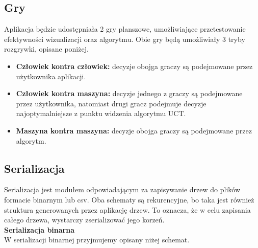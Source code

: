\documentclass{article}
\begin{document}
	\subsection{Gry}
	Aplikacja będzie udostępniała 2 gry planszowe, umożliwiające przetestowanie efektywności wizualizacji oraz algorytmu. Obie gry będą umożliwiały 3 tryby rozgrywki, opisane poniżej. \\
	
	\begin{itemize}
		\item \textbf{Człowiek kontra człowiek:} decyzje obojga graczy są podejmowane przez użytkownika aplikacji.
		\item \textbf{Człowiek kontra maszyna:} decyzje jednego z graczy są podejmowane przez użytkownika, natomiast drugi gracz podejmuje decyzje najoptymalniejsze z punktu widzenia algorytmu UCT.
		\item \textbf{Maszyna kontra maszyna:} decyzje obojga graczy są podejmowane przez algorytm. \\ 
	\end{itemize}
	
	\clearpage
	
	\subsection{Serializacja}
	Serializacja jest modułem odpowiadającym za zapisywanie drzew do plików formacie binarnym lub csv. Oba schematy są rekurencyjne, bo taka jest również struktura generowanych przez aplikację drzew. To oznacza, że w celu zapisania całego drzewa, wystarczy zserializować jego korzeń.\\
	
	\noindent \textbf{\large Serializacja binarna} \\
	W serializacji binarnej przyjmujemy opisany niżej schemat.\\
\end{document}
